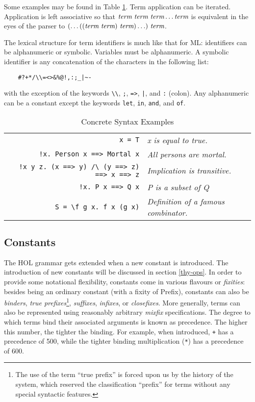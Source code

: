 \documentclass[12pt,fleqn,a4paper]{report}
\newcommand{\term}       {\mbox{\it term}}
\begin{document}
Some examples may be found in Table \ref{syntaxExamples}. Term
application can be iterated. Application is left associative so that
$\term\ \term\ \term \ldots \term$ is equivalent in the eyes of the
parser to $(\ldots((\term\ \term)\ \term) \ldots)\ \term$.

The lexical structure for term identifiers is much like that for
ML: identifiers can be alphanumeric or symbolic. Variables must be
alphanumeric. A symbolic identifier is any concatenation of the characters
in the following list:
\begin{verbatim}
    #?+*/\\=<>&%@!,:;_|~-
\end{verbatim}
with the exception of the keywords \verb+\\+, \verb+;+, \verb+=>+,
\verb+|+, and \verb+:+ (colon). Any alphanumeric can be a constant except the
keywords \verb+let+, \verb+in+, \verb+and+, and \verb+of+.

 \begin{table}[h]
\begin{center}
 \begin{tabular}{|r|l|} \hline
 \verb+x = T+ & {\it x is equal to true.} \\
 \verb+!x. Person x ==> Mortal x+ & {\it All persons are mortal.} \\
 \verb+!x y z. (x ==> y) /\ (y ==> z) ==> x ==> z+ & {\it Implication is
 transitive.} \\
 \verb+!x. P x ==> Q x+ & {\it P is a subset of Q} \\
 \verb+S = \f g x. f x (g x)+ & {\it Definition of a famous combinator.} \\ \hline
 \end{tabular}
 \caption{Concrete Syntax Examples}\label{syntaxExamples}
\end{center}
 \end{table}


\subsection{Constants}

The HOL grammar gets extended when a new constant is introduced. The
introduction of new constants will be discussed in section
\ref{thy-ops}. In order to provide some notational flexibility,
constants come in various flavours or {\it fixities}: besides being an
ordinary constant (with a fixity of {\sf Prefix}), constants can also
be {\it binders}, {\it true prefixes}\footnote{The use of the term
  ``true prefix'' is forced upon us by the history of the system,
  which reserved the classification ``prefix'' for terms without any
  special syntactic features.}, {\it suffixes}, {\it infixes}, or {\it
  closefixes}.  More generally, terms can also be represented using
reasonably arbitrary {\it mixfix} specifications.  The degree to which
terms bind their associated arguments is known as precedence.  The
higher this number, the tighter the binding.  For example, when
introduced, \verb-+- has a precedence of 500, while the tighter
binding multiplication (\verb+*+) has a precedence of 600.
\end{document}
